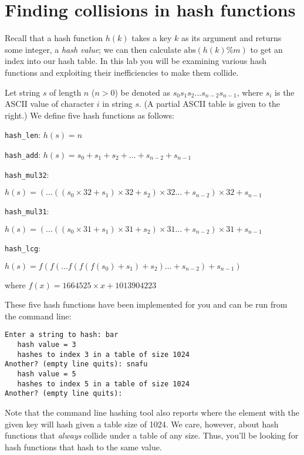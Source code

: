\section*{Finding collisions in hash functions}

\bgroup


Recall that a hash function $h(k)$ takes a key $k$ as its argument and
returns some integer, a \emph{hash value}; we can then calculate
$\textrm{abs}(h(k) \% m)$ to get an index into our hash table. In this
lab you will be examining various hash functions and exploiting their
inefficiencies to make them collide.

Let string $s$ of length $n$ ($n>0$) be denoted as
$s_0s_1s_2...s_{n-2}s_{n-1}$, where $s_i$ is the ASCII value of
character $i$ in string $s$. (A partial ASCII table is given to the
right.) We define five hash functions as follows:

\medskip
\lstinline'hash_len': $h(s) = n$

\medskip
\lstinline'hash_add':
$h(s) = s_0 + s_1 + s_2 + \dots + s_{n-2} + s_{n-1}$

\medskip
\lstinline'hash_mul32':

$h(s) = ( \dots ((s_0 \times 32 + s_1) \times 32 + s_2) \times 32 \dots + s_{n-2}) \times 32 + s_{n-1}$

\medskip
\lstinline'hash_mul31':

$h(s) = ( \dots ((s_0 \times 31 + s_1) \times 31 + s_2) \times 31 \dots + s_{n-2}) \times 31 + s_{n-1}$

\medskip
\lstinline'hash_lcg':

$h(s) = f(f( \dots f(f(f(s_0) + s_1) + s_2) \dots + s_{n-2}) + s_{n-1})$

where $f(x) = 1664525 \times x + 1013904223$

\medskip These five hash functions have been implemented for you and
can be run from the command line:

\begin{lstlisting}[language={[coin]C}]
% hash_len
Enter a string to hash: bar
   hash value = 3
   hashes to index 3 in a table of size 1024
Another? (empty line quits): snafu
   hash value = 5
   hashes to index 5 in a table of size 1024
Another? (empty line quits):
\end{lstlisting}


Note that the command line hashing tool also reports where the element with the
given key will hash given a table size of 1024. We care, however, about hash
functions that \emph{always} collide under a table of any size. Thus, you'll be
looking for hash functions that hash to the same value.
\egroup

